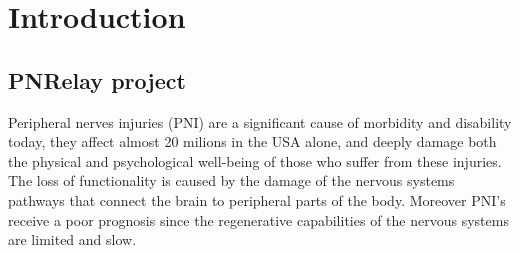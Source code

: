 \documentclass{Configuration_Files/PoliMi3i_thesis}
\begin{document}
\thispagestyle{empty}
\tableofcontents %
\thispagestyle{empty}
\cleardoublepage

%
%
%    
%

\mainmatter %

\chapter{Introduction}
\section{PNRelay project}
\nocite{*}
Peripheral nerves injuries (PNI) are a significant cause of morbidity and disability today,
they affect almost 20 milions in the USA alone, and deeply damage both the physical and psychological well-being of those who suffer from these injuries. \cite{zhangResearchHotspotsTrends2022}
The loss of functionality is caused by the damage of the nervous systems pathways that connect the brain to peripheral parts of the body.
Moreover PNI's receive a poor prognosis since the regenerative capabilities of the nervous systems are limited and slow.
\end{document}
